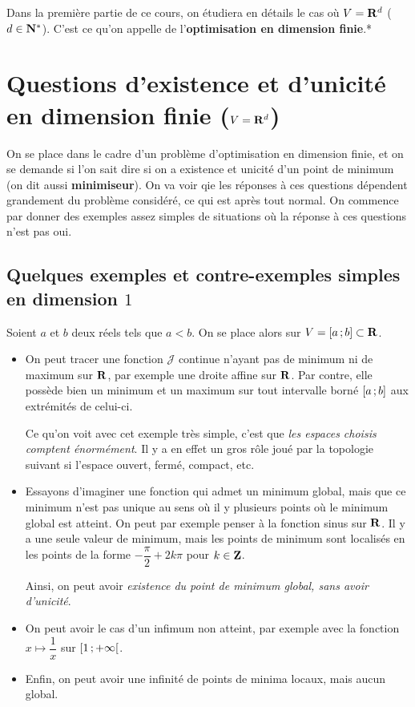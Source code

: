 \documentclass[grape]{../ceri/sty/MasterNotes}
\newcommand\J{\mathcal J}
\begin{document}
\vspace{\linewidth}

Dans la première partie de ce cours, on étudiera en détails le cas où $V=\mathbf{R}^d$ ($d\in\mathbf{N}^*$). C'est ce qu'on appelle de l'\textbf{optimisation en dimension finie}.*

\section{Questions d'existence et d'unicité en dimension finie ($V=\mathbf{R}^d$)}

On se place dans le cadre d'un problème d'optimisation en dimension finie, et on se demande si l'on sait dire si on a existence et unicité d'un point de minimum (on dit aussi \textbf{minimiseur}). On va voir qie les réponses à ces questions dépendent grandement du problème considéré, ce qui est après tout normal. On commence par donner des exemples assez simples de situations où la réponse à ces questions n'est pas oui.

\subsection{Quelques exemples et contre-exemples simples en dimension $1$}

Soient $a$ et $b$ deux réels tels que $a<b$. On se place alors sur $V=\intff ab\subset\R$.

\begin{itemize}[wide]
    \item On peut tracer une fonction $\J$ continue n'ayant pas de minimum ni de maximum sur $\mathbf{R}$, par exemple une droite affine sur $\mathbf{R}$. Par contre, elle possède bien un minimum et un maximum sur tout intervalle borné $\intff ab$ aux extrémités de celui-ci.

          Ce qu'on voit avec cet exemple très simple, c'est que \textit{les espaces choisis comptent énormément}. Il y a en effet un gros rôle joué par la topologie suivant si l'espace ouvert, fermé, compact, etc.
    \item Essayons d'imaginer une fonction qui admet un minimum global, mais que ce minimum n'est pas unique au sens où il y plusieurs points où le minimum global est atteint. On peut par exemple penser à la fonction sinus sur $\mathbf{R}$. Il y a une seule valeur de minimum, mais les points de minimum sont localisés en les points de la forme $-\dfrac\pi 2+2k\pi$ pour $k\in\mathbf{Z}$.

          Ainsi, on peut avoir \textit{existence du point de minimum global, sans avoir d'unicité}.
    \item On peut avoir le cas d'un infimum non atteint, par exemple avec la fonction $x\mapsto\dfrac 1x$ sur $\intfo 1{+\infty}$.
    \item Enfin, on peut avoir une infinité de points de minima locaux, mais aucun global.
\end{itemize}
\end{document}
